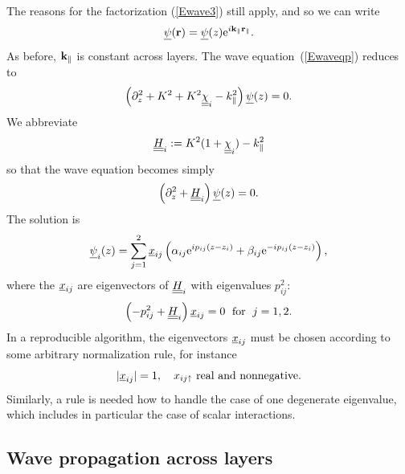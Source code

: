 The reasons for the factorization (\ref{Ewave3}) still apply,
and so we can write
\begin{equation}\label{Ewave3p}
\underline{\psi}(\mathbf{r}) = \underline{\psi}(z) {\rm e}^{i \mathbf{k}_\parallel\mathbf{r}_\parallel}.
\end{equation}
As before, $\mathbf{k}_\parallel$ is constant across layers.
The wave equation~(\ref{Ewaveqp}) reduces to 
\begin{equation}\label{Ewavezp}
\left(\partial_z^2 + K^2 + K^2\underline{\underline{\chi}}_i - k_\parallel^2 \right) \underline{\psi}(z) = 0.
\end{equation}
We abbreviate
\begin{equation}
  \underline{\underline{H}}_i := K^2(1+\underline{\underline{\chi}}_i)-k_\parallel^2
\end{equation}
so that the wave equation becomes simply
\begin{equation}\label{Ewaveqp2}
  \left(\partial_z^2 + \underline{\underline{H}}_i\right) \underline{\psi}(z) = 0.
\end{equation}
The solution is
\begin{equation}\label{Epsizp}
  \underline{\psi}_i(z)
  = \sum_{j=1}^2 \underline{x}_{ij}\left(\alpha_{ij}{\rm e}^{i p_{ij}(z-z_i)}
                            + \beta_{ij}{\rm e}^{-i p_{ij}(z-z_i)}\right),
\end{equation}
where the $\underline{x}_{ij}$ are eigenvectors of $\underline{\underline{H}}_i$
with eigenvalues $p_{ij}^2$:
\begin{equation}
  \left( -p_{ij}^2 + \underline{\underline{H}}_i \right) \underline{x}_{ij} = 0
   \;\text{ for }\;j=1,2.
\end{equation}
In a reproducible algorithm,
the eigenvectors $\underline{x}_{ij}$ must be chosen according to some arbitrary
normalization rule,
for instance
\begin{equation}
  |\underline{x}_{ij}|=1,\quad x_{ij\uparrow} \text{ real and nonnegative}.
\end{equation}
Similarly,
a rule is needed how to handle the case of one degenerate eigenvalue,
which includes in particular the case of scalar interactions.


\subsection{Wave propagation across layers}

